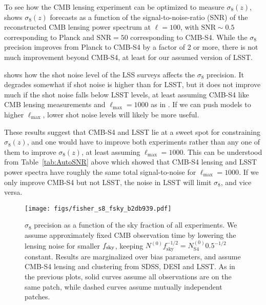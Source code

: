 \documentclass[prd,superscriptaddress,floatfix,notitlepage,nofootinbib,reprint]{revtex4-1} %
\begin{document}
To see how the CMB lensing experiment can be optimized to measure $\sigma_8(z)$,  shows $\sigma_8(z)$ forecasts as a function of the signal-to-noise-ratio (SNR) of the reconstructed CMB lensing power spectrum at $\ell=100$, with $\mathrm{SNR}\sim 0.5$ corresponding to Planck and $\mathrm{SNR}=50$ corresponding to CMB-S4.
While the $\sigma_8$ precision improves from Planck to CMB-S4 by a factor of 2 or more, there is not much improvement beyond CMB-S4, at least for our assumed version of LSST.

 shows how the shot noise level of the LSS surveys affects the
 $\sigma_8$ precision. 
It degrades somewhat if shot noise is higher than for LSST, but it does not improve much if the shot noise falls below LSST levels, at least assuming CMB-S4 like CMB lensing measurements and $\ell_\mathrm{max}=1000$ as in .
If we can push models to higher $\ell_\mathrm{max}$, lower shot noise levels will likely be more useful.

These results suggest that CMB-S4 and LSST lie at a sweet spot for constraining $\sigma_8(z)$, and one would have to improve both experiments rather than any one of them to improve $\sigma_8(z)$, at least assuming $\ell_\mathrm{max}=1000$. 
This can be understood from Table~\ref{tab:AutoSNR} above which showed that CMB-S4 lensing and LSST power spectra have roughly the same total signal-to-noise for $\ell_\mathrm{max}=1000$. 
If we only improve CMB-S4 but not LSST, the noise in LSST will limit $\sigma_8$, and vice versa.



\begin{figure}[tbp]
\texttt{[image: figs/fisher\_s8\_fsky\_b2db939.pdf]}
\caption{$\sigma_8$ precision as a function of the sky fraction of all experiments.
We assume approximately fixed CMB observation time by lowering the lensing noise for smaller ${f_\mathrm{sky}}$, keeping $N^{(0)}f_\mathrm{sky}^{-1/2}=N^{(0)}_\mathrm{S4}0.5^{-1/2}$ constant.
Results are marginalized over bias parameters, and assume CMB-S4 lensing and clustering from SDSS, DESI and LSST. 
As in the previous plots, solid curves assume all observations are on the same patch, while dashed curves assume mutually independent patches.
}
\label{fig:s8_fsky}
\end{figure}
\end{document}
